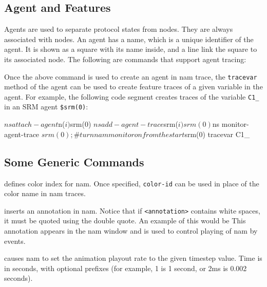 \subsection{Agent and Features}

Agents are used to separate protocol states from nodes. They are always
associated with nodes. An agent has a name, which is a unique identifier
of the agent. It is shown as a square with its name inside, and a line
link the square to its associated node. The following are commands that
support agent tracing:

Once the above command is used to create an agent in nam trace, the
{\tt tracevar} method of the \ns agent can be used to create feature
traces of a given variable in the agent. 
For example, the following code segment creates traces of the variable
{\tt C1\_} in an SRM agent {\tt \$srm(0)}:

\begin{program}
        $ns attach-agent $n($i) $srm(0)
        $ns add-agent-trace $srm($i) srm(0)
        $ns monitor-agent-trace $srm(0) ;\# turn nam monitor on from the start
        $srm(0) tracevar C1_
\end{program} %

\subsection{Some Generic Commands}

defines color index for nam. Once
specified, {\tt color-id} can be used in place of the color name in
nam traces.

inserts an annotation in nam. Notice that if {\tt <annotation>} 
contains white spaces, it must be quoted using the double quote.
An example of this would be
This annotation appears in the nam window and is used to control
playing of nam by events. 

causes nam to set the animation playout rate to
the given timestep value.
Time is in seconds, with optional prefixes (for example, 1 is 1 second, or 2ms is 0.002 seconds).


